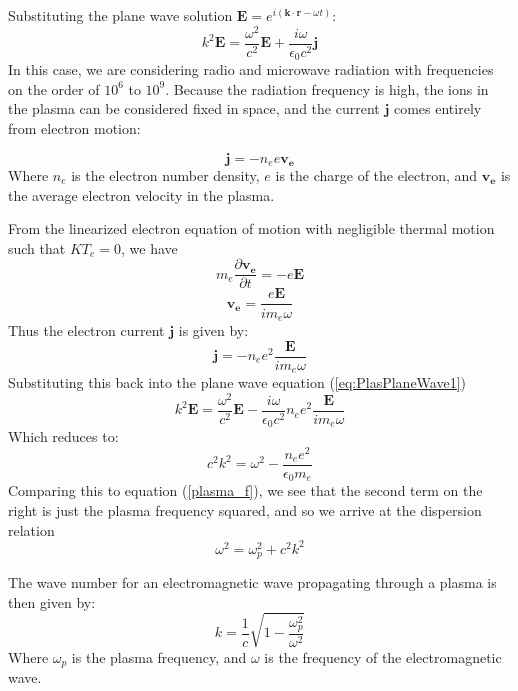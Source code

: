\documentclass[twocolumn]{article}
\begin{document}
Substituting the plane wave solution $\mathbf{E} = e^{i(\mathbf{k} \cdot \mathbf{r} - \omega t)}$:
\begin{equation}
	\label{eq:PlasPlaneWave1}
	k^2\mathbf{E} = \frac{\omega^2}{c^2}\mathbf{E} + \frac{i\omega}{\epsilon_0 c^2}\mathbf{j}
\end{equation}
In this case, we are considering radio and microwave radiation with frequencies on the order of $10^6$ to $10^9$.
Because the radiation frequency is high, the ions in the plasma can be considered fixed in space, and the current $\mathbf{j}$ comes entirely from electron motion:
 
\begin{equation}
	\mathbf{j} = -n_ee\mathbf{v_e}
\end{equation}
Where $n_e$ is the electron number density, $e$ is the charge of the electron, and $\mathbf{v_e}$ is the average electron velocity in the plasma.

From the linearized electron equation of motion with negligible thermal motion such that $KT_e = 0$, we have
\begin{equation}
	m_e\frac{\partial \mathbf{v_e}}{\partial t} = -e\mathbf{E}
\end{equation}
\begin{equation}
	\mathbf{v_e} = \frac{e\mathbf{E}}{im_e\omega}
\end{equation}
Thus the electron current $\mathbf{j}$ is given by:
\begin{equation}
	\mathbf{j} = -n_ee^2\frac{\mathbf{E}}{im_e\omega}
\end{equation}
Substituting this back into the plane wave equation (\ref{eq:PlasPlaneWave1})
\begin{equation}
	k^2\mathbf{E} = \frac{\omega^2}{c^2}\mathbf{E} - \frac{i\omega}{\epsilon_0 c^2}n_ee^2\frac{\mathbf{E}}{im_e\omega}
\end{equation}
Which reduces to:
\begin{equation*}
	c^2k^2 = \omega^2 - \frac{n_ee^2}{\epsilon_0m_e}
\end{equation*}
Comparing this to equation (\ref{plasma_f}), we see that the second term on the right is just the plasma frequency squared, and so we arrive at the dispersion relation
\begin{equation}
	\omega^2 = \omega^2_p + c^2k^2
\end{equation}

The wave number for an electromagnetic wave propagating through a plasma is then given by:
\begin{equation}
	\label{eq:EMWaveNumber}
	k = \frac{1}{c}\sqrt{1-\frac{\omega^2_p}{\omega^2}}	
\end{equation}
Where $\omega_p$ is the plasma frequency, and $\omega$ is the frequency of the electromagnetic wave.
\end{document}
